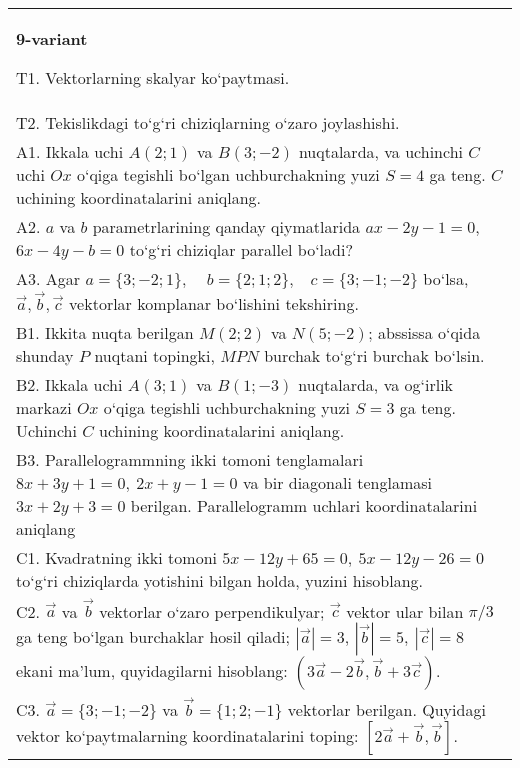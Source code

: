 \documentclass{article}
\begin{document}
\begin{tabular}{m{17cm}}
\textbf{9-variant}

T1. 
Vektorlarning skalyar ko‘paytmasi.
 \\
T2. 
Tekislikdagi to‘g‘ri chiziqlarning o‘zaro joylashishi.
 \\
A1. 
Ikkala uchi $A (2;1) $ va $B (3;-2) $ nuqtalarda, va
uchinchi $C$ uchi $Ox$ o‘qiga tegishli bo‘lgan uchburchakning
yuzi $S=4$ ga teng. $C$ uchining koordinatalarini aniqlang.
 \\
A2. 
$a$ va $b$ parametrlarining qanday qiymatlarida
$ax-2y-1=0$, $6x-4y-b=0$ to‘g‘ri chiziqlar parallel bo‘ladi?
 \\
A3. 
Agar \(a = \{ 3; - 2;1\},\ \ \ \ \ b = \{ 2;1;2\},\ \ \ \ c = \{ 3; - 1; - 2\}\) bo‘lsa, $\overrightarrow{a}, \overrightarrow{b}, \overrightarrow{c}$ vektorlar komplanar bo‘lishini tekshiring.
 \\
B1. 
Ikkita nuqta berilgan \(M (2;2) \) va \(N (5;-2) \); abssissa o‘qida shunday $P$ nuqtani topingki, $MPN$ burchak to‘g‘ri burchak bo‘lsin.
 \\
B2. 
Ikkala uchi \(A (3;1) \) va \(B (1;-3) \) nuqtalarda, va
og‘irlik markazi $Ox$ o‘qiga tegishli uchburchakning yuzi
\(S=3\) ga teng. Uchinchi $C$ uchining koordinatalarini aniqlang.
 \\
B3. 
Parallelogrammning ikki tomoni tenglamalari
\(8x+3y+1=0,\ 2x+y-1=0\) va bir diagonali tenglamasi
\(3x+2y+3=0\) berilgan. Parallelogramm uchlari koordinatalarini
aniqlang
 \\
C1. 
Kvadratning ikki tomoni
\(5x-12y+65=0,\ 5x-12y-26=0\) to‘g‘ri chiziqlarda
yotishini bilgan holda, yuzini hisoblang.
 \\
C2. 
$\vec{a}$ va $\vec{b}$ vektorlar o‘zaro perpendikulyar; $\vec{c}$ vektor ular bilan $\pi/3$ ga teng bo‘lgan burchaklar hosil qiladi; $|\vec{a}| = 3$, $|\vec{b}| = 5,\ |\vec{c}| = 8$ ekani ma’lum, quyidagilarni hisoblang:
$\left(3\vec{a} - 2\vec{b},\vec{b} + 3\vec{c} \right) $.
 \\
C3. 
$\vec{a} = \{ 3; - 1; - 2\}$ va $\vec{b} = \{ 1;2; - 1\}$ vektorlar berilgan. Quyidagi vektor ko‘paytmalarning koordinatalarini toping:
$\left\lbrack 2\vec{a} + \vec{b},\vec{b} \right\rbrack$.
 \\

\end{tabular}
\vspace{1cm}
\end{document}
